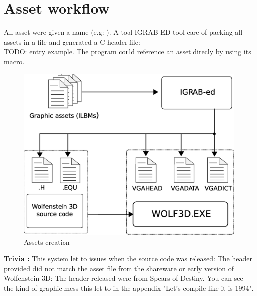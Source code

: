 \documentclass[book.tex]{subfiles}
\begin{document}
\section{Asset workflow}
All asset were given a name (e.g: ). A tool IGRAB-ED tool care of packing all assets in a file and generated a C header file:\\
TODO: entry example.
 The program could reference an asset direcly by using its macro.\\
\begin{figure}[H]
\centering
 \includegraphics[scale=0.4]{imgs/drawing_plain.eps}
 \caption{Assets creation} \label{fig:mips}
 \end{figure}

\textbf{\underline{Trivia :}} This system let to issues when the source code was released: The header provided did not match the asset file from the shareware or early version of Wolfenstein 3D: The header released were from Spears of Destiny. You can see the kind of graphic mess this let to in the appendix "Let's compile like it is 1994".\\
\end{document}
